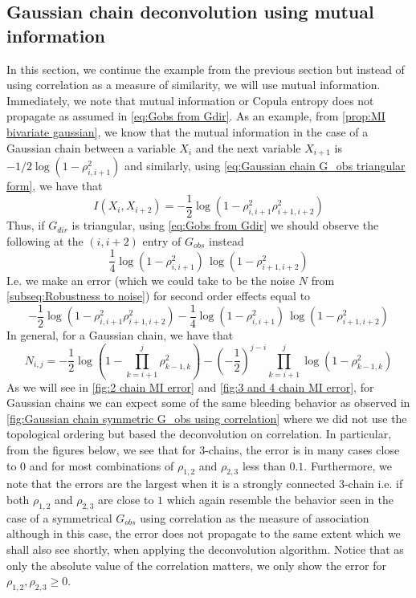 \documentclass[../Thesis.tex]{subfiles}
\begin{document}
\newpage

\subsection{Gaussian chain deconvolution using mutual information}
In this section, we continue the example from the previous section but instead of using correlation as a measure of similarity, we will use mutual information. Immediately, we note that mutual information or Copula entropy does not propagate as assumed in \autoref{eq:Gobs from Gdir}. As an example, from \autoref{prop:MI bivariate gaussian}, we know that the mutual information in the case of a Gaussian chain between a variable $X_i$ and the next variable $X_{i+1}$ is $-1/2 \log\left(1 - \rho_{i,i+1}^2\right)$ and similarly, using \autoref{eq:Gaussian chain G_obs triangular form}, we have that
$$I\left(X_i, X_{i+2}\right) = -\frac{1}{2} \log \left(1 - \rho_{i,i+1}^2 \rho_{i+1,i+2}^2\right)$$
Thus, if $G_{dir}$ is triangular, using \autoref{eq:Gobs from Gdir} we should observe the following at the $(i,i+2)$ entry of $G_{obs}$ instead
$$\frac{1}{4} \log\left(1 - \rho_{i,i+1}^2\right)\,\log\left(1 - \rho_{i+1,i+2}^2\right)$$
I.e. we make an error (which we could take to be the noise $N$ from \autoref{subseq:Robustness to noise}) for second order effects equal to
$$-\frac{1}{2} \log \left(1 - \rho_{i,i+1}^2 \rho_{i+1,i+2}^2\right) - \frac{1}{4} \log\left(1 - \rho_{i,i+1}^2\right)\,\log\left(1 - \rho_{i+1,i+2}^2\right)$$
In general, for a Gaussian chain, we have that
$$N_{i,j} = -\frac{1}{2} \log\left( 1 - \prod_{k=i+1}^{j} \rho_{k-1,k}^2\right) - \left(-\frac{1}{2}\right)^{j-i}\prod_{k=i+1}^{j} \log\left(1 - \rho_{k-1,k}^2\right)$$
As we will see in \autoref{fig:2 chain MI error} and \autoref{fig:3 and 4 chain MI error}, for Gaussian chains we can expect some of the same bleeding behavior as observed in \autoref{fig:Gaussian chain symmetric G_obs using correlation} where we did not use the topological ordering but based the deconvolution on correlation. In particular, from the figures below, we see that for $3$-chains, the error is in many cases close to $0$ and for most combinations of $\rho_{1,2}$ and $\rho_{2,3}$ less than $0.1$. Furthermore, we note that the errors are the largest when it is a strongly connected $3$-chain i.e. if both $\rho_{1,2}$ and $\rho_{2,3}$ are close to $1$ which again resemble the behavior seen in the case of a symmetrical $G_{obs}$ using correlation as the measure of association although in this case, the error does not propagate to the same extent which we shall also see shortly, when applying the deconvolution algorithm. Notice that as only the absolute value of the correlation matters, we only show the error for $\rho_{1,2}, \rho_{2,3} \geq 0$.
\end{document}
